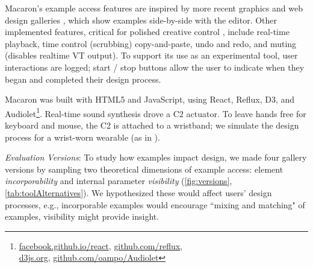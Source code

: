 Macaron's example access features are inspired by more recent graphics and web design galleries \cite{Marks1997,Lee2010a,Ritchie2011}, which show examples side-by-side with the editor.
Other implemented features, critical for polished creative control \cite{Schneider2015}, include real-time playback, time control (scrubbing) %
copy-and-paste, undo and redo, and muting (disables realtime VT output).
%
To support its use as an experimental tool, user interactions are logged; 
start / stop buttons allow the user to indicate when they began and completed their design process.

 
Macaron was built with HTML5 and JavaScript, using React, Reflux, D3, and
Audiolet\footnote{\url{facebook.github.io/react}, \url{github.com/reflux}, \\ \url{d3js.org}, \url{github.com/oampo/Audiolet}}. Real-time sound synthesis drove a C2 actuator.
To leave %
hands free for keyboard and mouse, the C2 is attached to a wristband; we simulate the design process for a wrist-worn wearable (as in \cite{Seifi2015}).


%
%

\emph{Evaluation Versions}: To study how examples impact design, we made four gallery versions by sampling two theoretical dimensions of example access:
element \emph{incorporability} and internal parameter \emph{visibility} (\autoref{fig:versions}, \autoref{tab:toolAlternatives}).
We hypothesized these would affect users' design processes, e.g., incorporable examples would encourage ``mixing and matching" of examples, visibility might provide insight.

